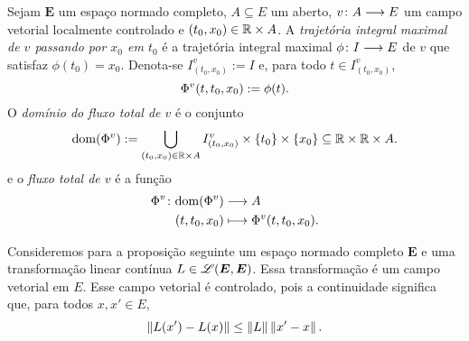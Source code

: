 \begin{definition}
Sejam $\bm E$ um espaço normado completo, $A \subseteq E$ um aberto, $\fun{v}{A}{E}$ um campo vetorial localmente controlado e $(t_0, x_0) \in \R \times A$. A \emph{trajetória integral maximal de $v$ passando por $x_0$ em $t_0$} é a trajetória integral maximal $\fun{\phi}{I}{E}$ de $v$ que satisfaz $\phi(t_0) = x_0$. Denota-se $I^v_{(t_0, x_0)} := I$ e, para todo $t \in I^v_{(t_0, x_0)}$,
	\begin{equation*}
	\Flux[v](t, t_0, x_0) := \phi(t).
	\end{equation*}
O \emph{domínio do fluxo total de $v$} é o conjunto
	\begin{equation*}
	\dom(\Flux[v]) := \bigcup_{(t_0, x_0) \in \R \times A} I^v_{(t_0, x_0)} \times \{t_0\} \times \{x_0\} \subseteq \R \times \R \times A.
	\end{equation*}
e o \emph{fluxo total de $v$} é a função
	\begin{align*}
	\func{\Flux[v]}{\dom(\Flux[v])}{A}{(t,t_0,x_0)}{\Flux[v](t, t_0, x_0)}.
	\end{align*}
\end{definition}

Consideremos para a proposição seguinte um espaço normado completo $\bm E$ e uma transformação linear contínua $L \in \toplin(\bm E, \bm E)$. Essa transformação é um campo vetorial em $E$. Esse campo vetorial é controlado, pois a continuidade significa que, para todos $x,x' \in E$,
	\begin{equation*}
	\nor{L(x') - L(x)} \leq \nor{L}\nor{x'-x}.
	\end{equation*}

